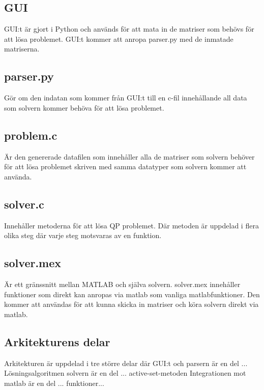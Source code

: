 \subsection{GUI}
GUI:t är gjort i Python och används för att mata in de matriser som behövs för att lösa problemet. GUI:t kommer att anropa parser.py med de inmatade matriserna.

\subsection{parser.py}
Gör om den indatan som kommer från GUI:t till en c-fil innehållande all data som solvern kommer behöva för att lösa problemet.

\subsection{problem.c}
Är den genererade datafilen som innehåller alla de matriser som solvern behöver för att lösa problemet skriven med samma datatyper som solvern kommer att använda.

\subsection{solver.c}
Innehåller metoderna för att lösa QP problemet. Där metoden är uppdelad i flera olika steg där varje steg motsvaras av en funktion.

\subsection{solver.mex}
Är ett gränssnitt mellan MATLAB och själva solvern. solver.mex innehåller funktioner som direkt kan anropas via matlab som vanliga matlabfunktioner. Den kommer att användas för att kunna skicka in matriser och köra solvern direkt via matlab.

\subsection{Arkitekturens delar}
Arkitekturen är uppdelad i tre större delar där GUI:t och parsern är en del ...
Lösningsalgoritmen solvern är en del ... active-set-metoden
Integrationen mot matlab är en del ... funktioner...

